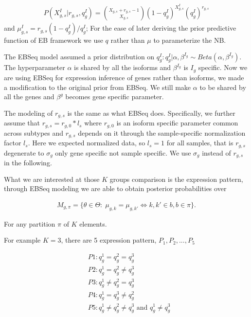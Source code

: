 \documentclass[aoas,preprint]{imsart}
\begin{document}
\begin{eqnarray*}
P(X_{g,s}^I | r_{g,s}, q_g^I ) = {X_{g,s} + r_{g,s} - 1 \choose X_{g,s} }(1 - q_g^I)^{X_{g,s}^I} (q_g^I)^{r_{g,s}}
\end{eqnarray*}
and $\mu_{g,s}^I = r_{g,s}(1 - q_g^I) / q_g^I$; For the ease of later deriving the prior predictive function of EB framework we use $q$ rather than $\mu$ to parameterize the NB.  %

The EBSeq model assumed a prior distribution on $q_g^I : q_g^I | \alpha, \beta^{I_g} \sim Beta(\alpha, \beta^{I_g}).$ The hyperparameter $\alpha$ is shared by all the isoforms and $\beta^{I_g}$ is $I_g$ specific.
Now we are using EBSeq for expression inference of genes rather than isoforms, we made a modification to the original prior from EBSeq. 
We still make $\alpha$ to be shared by all the genes and $\beta^g$ becomes gene specific parameter. 

The modeling of $r_{g,s}$ is the same as what EBSeq does. Specifically, we further assume that $r_{g,s} = r_{g,0}*l_s$ where $r_{g,0}$ is an isoform specific parameter common across subtypes and $r_{g,s}$ depends on it through the sample-specific normalization factor $l_s$. Here we expected normalized data, so $l_s = 1$ for all samples, that is $r_{g,s}$ degenerate to $
\sigma_g$ only gene specific not sample specific. We use $\sigma_g$ instead of $r_{g,s}$ in the following. 

What we are interested at those $K$ groups comparison is the expression pattern, through EBSeq modeling we are able to obtain posterior probabilities over

\begin{eqnarray*}
M_{g,\pi} = \{ \theta \in \Theta: \; \mu_{g,k} = \mu_{g,k'} \iff k,k' \in b, b \in \pi \}.
\end{eqnarray*}

For any partition $\pi$ of $K$ elements.

For example $K = 3$, there are 5 expression pattern, $P_1, P_2, ..., P_5$

\begin{align*}
&P1: q_g^1 = q_g^2 = q_g^3\\
&P2: q_g^1 = q_g^2 \neq q_g^3\\
&P3: q_g^1 \neq q_g^2 = q_g^3\\
&P4: q_g^1 = q_g^3 \neq q_g^2\\
&P5: q_g^1 \neq q_g^2 \neq q_g^3 \text{ and } q_g^1 \neq q_g^3
\end{align*}
\end{document}
